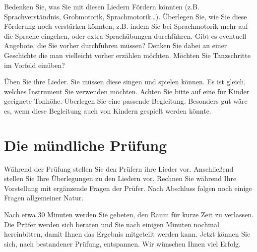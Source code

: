 \documentclass[10pt,a4paper,twoside]{report}
\begin{document}
Bedenken Sie, was Sie mit diesen Liedern Fördern könnten (z.B. Sprachverständnis, 
Grobmotorik, Sprachmotorik\ldots). Überlegen Sie, wie Sie diese Förderung noch 
verstärken könnten, z.B. indem Sie bei Sprachmotorik mehr auf die Sprache eingehen,
oder extra Sprachübungen durchführen. Gibt es eventuell Angebote, die Sie vorher
durchführen müssen? Denken Sie dabei an einer Geschichte die man vielleicht vorher
erzählen möchten. Möchten Sie Tanzschritte im Vorfeld einüben?

Üben Sie ihre Lieder. Sie müssen diese singen und spielen können. Es ist gleich, welches
Instrument Sie verwenden möchten. Achten Sie bitte auf eine für Kinder geeignete Tonhöhe.
Überlegen Sie eine passende Begleitung. Besonders gut wäre es, wenn diese Begleitung auch von
Kindern gespielt werden könnte.

\section{Die mündliche Prüfung}
Während der Prüfung stellen Sie den Prüfern ihre Lieder vor. 
Anschließend stellen Sie Ihre Überlegungen zu den Liedern vor. Rechnen Sie 
während Ihre Vorstellung mit ergänzende Fragen der Prüfer. Nach Abschluss folgen noch einige 
Fragen allgemeiner Natur.

Nach etwa 30 Minuten werden Sie gebeten, den Raum für kurze Zeit zu verlassen. Die Prüfer
werden sich beraten und Sie nach einigen Minuten nochmal hereinbitten, damit Ihnen das 
Ergebnis mitgeteilt werden kann. Jetzt können Sie sich, nach bestandener Prüfung, entspannen.
Wir wünschen Ihnen viel Erfolg.

%
%
\end{document}
